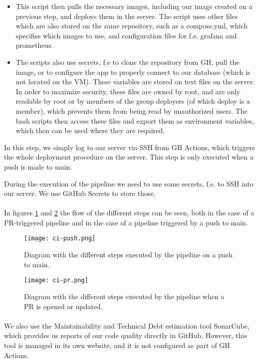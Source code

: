 \begin{enumerate}
\begin{itemize}
		\item This script then pulls the necessary images, including our image created on a previous step, and deploys them in the server. The script uses other files which are also stored on the same repository, such as a compose.yml, which specifies which images to use, and configuration files for f.e. grafana and prometheus.
		\item The scripts also use secrets, f.e to clone the repository from GH, pull the image, or to configure the app to properly connect to our database (which is not located on the VM). These variables are stored on text files on the server. In order to maximize security, these files are owned by root, and are only readable by root or by members of the group deployers (of which deploy is a member), which prevents them from being read by unauthorized users. The bash scripts then access these files and export them as environment variables, which then can be used where they are required.
	\end{itemize}
	In this step, we simply log to our server via SSH from GH Actions, which triggers the whole deployment procedure on the server. This step is only executed when a push is made to main. 
\end{enumerate}
During the execution of the pipeline we need to use some secrets, f.e. to SSH into our server. We use GitHub Secrets to store those.

\paragraph{} In figures \ref{fig:ci-push} and \ref{fig:ci-pr} the flow of the different steps can be seen, both in the case of a PR-triggered pipeline and in the case of a pipeline triggered by a push to main.

\begin{figure}[h]
	\centering
	\texttt{[image: ci-push.png]}
	\caption{Diagram with the different steps executed by the pipeline on a push to main.}
	\label{fig:ci-push}
\end{figure}

\begin{figure}[h]
	\centering
	\texttt{[image: ci-pr.png]}
	\caption{Diagram with the different steps executed by the pipeline when a PR is opened or updated.}
	\label{fig:ci-pr}
\end{figure}

\paragraph{} We also use the Maintainability and Technical Debt estimation tool SonarCube, which provides us reports of our code quality directly in GitHub. However, this tool is managed in its own website, and it is not configured as part of GH Actions.

